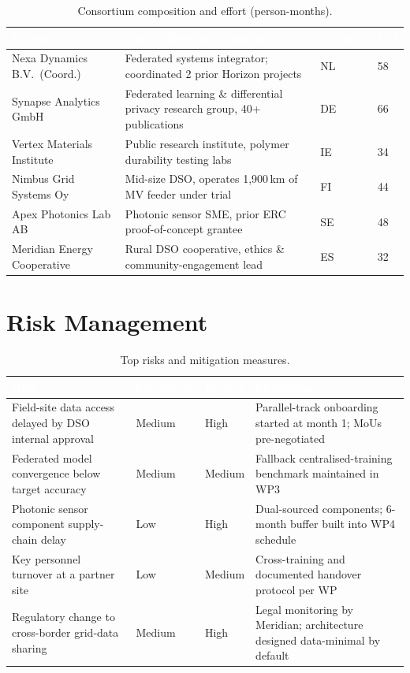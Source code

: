 \documentclass[11pt,a4paper,parskip=half]{scrreprt}
\begin{document}
\begin{table}[h]
\small
\renewcommand{\arraystretch}{1.3}
\begin{tabularx}{\linewidth}{@{}l X l l@{}}
\toprule
\rowcolor{eublue}
\textcolor{white}{Partner} & \textcolor{white}{Role \& Relevant Capacity} & \textcolor{white}{Country} & \textcolor{white}{PM} \\
\midrule
Nexa Dynamics B.V.\ (Coord.) & Federated systems integrator; coordinated 2 prior Horizon
projects & NL & 58 \\
\rowcolor{lightgray}
Synapse Analytics GmbH & Federated learning \& differential privacy research group, 40+
publications & DE & 66 \\
Vertex Materials Institute & Public research institute, polymer durability testing labs & IE & 34 \\
\rowcolor{lightgray}
Nimbus Grid Systems Oy & Mid-size DSO, operates 1{,}900\,km of MV feeder under trial & FI & 44 \\
Apex Photonics Lab AB & Photonic sensor SME, prior ERC proof-of-concept grantee & SE & 48 \\
\rowcolor{lightgray}
Meridian Energy Cooperative & Rural DSO cooperative, ethics \& community-engagement lead & ES & 32 \\
\bottomrule
\end{tabularx}
\caption{Consortium composition and effort (person-months).}
\end{table}

\section{Risk Management}

\begin{table}[h]
\small
\renewcommand{\arraystretch}{1.35}
\begin{tabularx}{\linewidth}{@{}X l l X@{}}
\toprule
\rowcolor{eublue}
\textcolor{white}{Risk} & \textcolor{white}{Likelihood} & \textcolor{white}{Impact} & \textcolor{white}{Mitigation} \\
\midrule
Field-site data access delayed by DSO internal approval & Medium & High &
\cellcolor{riskHigh}Parallel-track onboarding started at month 1; MoUs pre-negotiated \\
\addlinespace
Federated model convergence below target accuracy & Medium & Medium &
\cellcolor{riskMed}Fallback centralised-training benchmark maintained in WP3 \\
\addlinespace
Photonic sensor component supply-chain delay & Low & High &
\cellcolor{riskHigh}Dual-sourced components; 6-month buffer built into WP4 schedule \\
\addlinespace
Key personnel turnover at a partner site & Low & Medium &
\cellcolor{riskMed}Cross-training and documented handover protocol per WP \\
\addlinespace
Regulatory change to cross-border grid-data sharing & Medium & High &
\cellcolor{riskHigh}Legal monitoring by Meridian; architecture designed data-minimal by default \\
\bottomrule
\end{tabularx}
\caption{Top risks and mitigation measures.}
\end{table}
\end{document}
